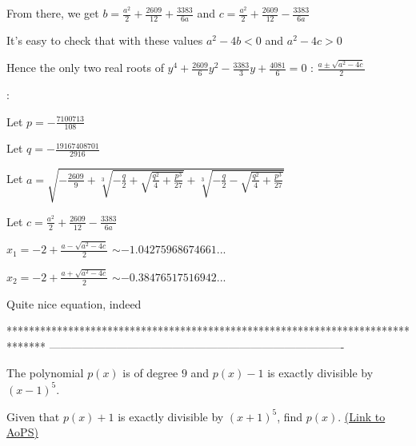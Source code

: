 \begin{solution}
From there, we get $b=\frac{a^2}2+\frac{2609}{12}+\frac{3383}{6a}$ and $c=\frac{a^2}2+\frac{2609}{12}-\frac{3383}{6a}$

It's easy to check that with these values $a^2-4b<0$ and $a^2-4c>0$

Hence the only two real roots of $y^4+\frac{2609}6y^2-\frac{3383}3y+\frac{4081}6=0$ : $\frac{a\pm\sqrt{a^2-4c}}2$

 :

Let $p=-\frac{7100713}{108}$

Let $q=-\frac{19167408701}{2916}$

Let $a=\sqrt{-\frac{2609}9+\sqrt[3]{-\frac q2+\sqrt{\frac{q^2}4+\frac{p^3}{27}}}+\sqrt[3]{-\frac q2-\sqrt{\frac{q^2}4+\frac{p^3}{27}}}}$

Let $c=\frac{a^2}2+\frac{2609}{12}-\frac{3383}{6a}$

$\boxed{x_1=-2+\frac{a-\sqrt{a^2-4c}}2}$ $\sim -1.04275968674661...$

$\boxed{x_2=-2+\frac{a+\sqrt{a^2-4c}}2}$ $\sim -0.38476517516942...$

Quite nice equation, indeed 
\end{solution}
*******************************************************************************
-------------------------------------------------------------------------------

\begin{problem}
	The polynomial $p(x)$ is of degree $9$ and $p(x)-1$ is exactly divisible by $(x-1)^{5}$.

Given that $p(x) + 1$ is exactly divisible by $(x+1)^{5}$, find $p(x)$.
	\flushright \href{https://artofproblemsolving.com/community/c6h530043}{(Link to AoPS)}
\end{problem}



